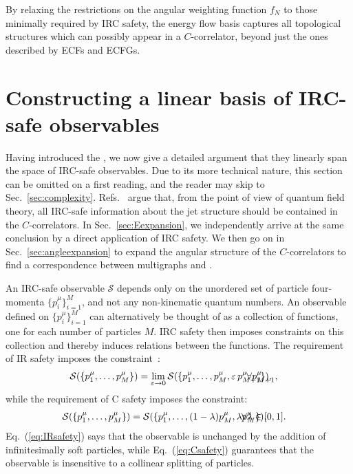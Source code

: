 \documentclass[letterpaper,11pt]{article}
\DeclareRobustCommand{\Sec}[1]{Sec.~\ref{#1}}
\DeclareRobustCommand{\Eq}[1]{Eq.~(\ref{#1})}
\DeclareRobustCommand{\Refs}[1]{Refs.~\cite{#1}}
\newcommand{\Bs}{\text{EFPs}\xspace}
\begin{document}
By relaxing the restrictions on the angular weighting function $f_N$ to those minimally required by IRC safety, the energy flow basis captures all topological structures which can possibly appear in a $C$-correlator, beyond just the ones described by ECFs and ECFGs.


\section{Constructing a linear basis of IRC-safe observables}
\label{sec:basis}

Having introduced the \Bs, we now give a detailed argument that they linearly span the space of IRC-safe observables.
%
Due to its more technical nature, this section can be omitted on a first reading, and the reader may skip to \Sec{sec:complexity}.
%
\Refs{Tkachov:1995kk,Sveshnikov:1995vi,Cherzor:1997ak,Tkachov:1999py} argue that, from the point of view of quantum field theory, all IRC-safe information about the jet structure should be contained in the $C$-correlators.
%
In \Sec{sec:Eexpansion}, we independently arrive at the same conclusion by a direct application of IRC safety.
%
We then go on in \Sec{sec:angleexpansion} to expand the angular structure of the $C$-correlators to find a correspondence between multigraphs and \Bs.

An IRC-safe observable $\mathcal S$ depends only on the unordered set of particle four-momenta $\{p^\mu_i\}_{i=1}^M$, and not any non-kinematic quantum numbers.
%
An observable defined on $\{p^\mu_i\}_{i=1}^M$ can alternatively be thought of as a collection of functions, one for each number of particles $M$.
%
IRC safety then imposes constraints on this collection and thereby induces relations between the functions.
%
The requirement of IR safety imposes the constraint~\cite{sterman1995handbook}:
\begin{align}\label{eq:IRsafety}
\mathcal S(\{p_1^\mu,\ldots,p_M^\mu\}) & = \lim_{\varepsilon \to 0}\mathcal S(\{p_1^\mu,\ldots, p_M^\mu, \varepsilon \, p_{M+1}^\mu\}),&&\hspace{-.5in}\forall p_{M+1}^\mu,
\end{align}
while the requirement of C safety imposes the constraint:
\begin{align}
\label{eq:Csafety}
\mathcal S(\{p_1^\mu,\ldots,p_M^\mu\}) & = \mathcal S(\{p_1^\mu,\ldots,(1 - \lambda) p_M^\mu, \lambda p_M^\mu\}),&&\hspace{-.5in}\forall \lambda\in[0,1].
\end{align}
%
\Eq{eq:IRsafety} says that the observable is unchanged by the addition of infinitesimally soft particles, while \Eq{eq:Csafety} guarantees that the observable is insensitive to a collinear splitting of particles.
\end{document}

